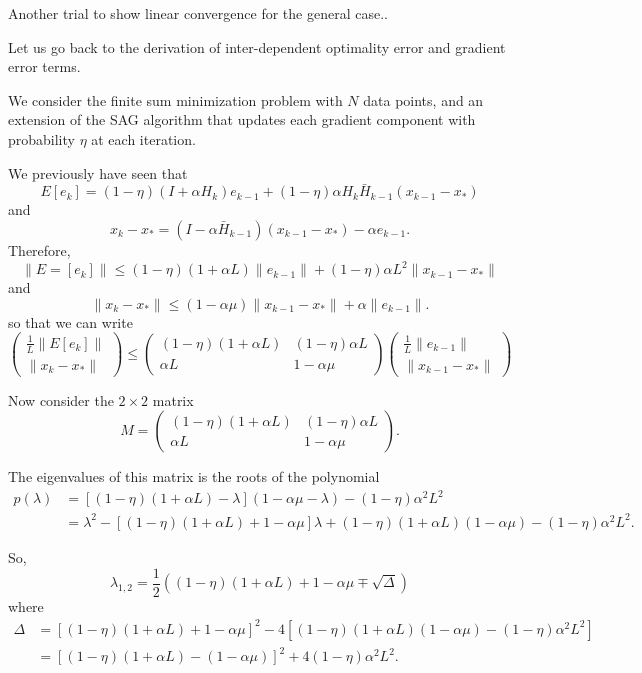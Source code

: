 \documentclass{article}
\begin{document}
 
\noindent

Another trial to show linear convergence for the general case..

\bigskip

Let us go back to the derivation of inter-dependent optimality error and gradient error terms.

We consider the finite sum minimization problem with $N$ data points, and an extension of the SAG algorithm that updates each gradient component with probability $\eta$ at each iteration.

We previously have seen that
\[
  E[e_k]=(1-\eta)(I+\alpha H_k)e_{k-1} + (1-\eta)\alpha H_k\bar H_{k-1}(x_{k-1}-x_\ast)
\]
and
\[
x_k-x_\ast=(I-\alpha\bar H_{k-1})(x_{k-1}-x_\ast) -\alpha e_{k-1}.
\]
Therefore,
\[
  \|E=[e_k]\|\leq(1-\eta)(1+\alpha L)\|e_{k-1}\| + (1-\eta)\alpha L^2\|x_{k-1}-x_\ast\|
\]
and
\[
\|x_k-x_\ast\|\leq(1-\alpha\mu)\|x_{k-1}-x_\ast\| +\alpha \|e_{k-1}\|.
\]
so that we can write
\[
 \begin{pmatrix} \displaystyle\frac{1}{L}\|E[e_k]\| \\
  \|x_k-x_\ast\|
 \end{pmatrix} \leq 
 \begin{pmatrix} (1-\eta)(1+\alpha L) & (1-\eta)\alpha L\\  
                   \alpha L  & 1-\alpha\mu \end{pmatrix}                  
 \begin{pmatrix} \displaystyle\frac{1}{L}\|e_{k-1}\| \\
  \|x_{k-1}-x_\ast\|
 \end{pmatrix}                  
\]

\bigskip
Now consider the $2\times 2$ matrix
\[
M = \begin{pmatrix} (1-\eta)(1+\alpha L) & (1-\eta)\alpha L\\  
                   \alpha L  & 1-\alpha\mu \end{pmatrix}.    
\]

The eigenvalues of this matrix is the roots of the polynomial
\begin{align*}
p(\lambda) &= \left[(1-\eta)(1+\alpha L)-\lambda\right](1-\alpha\mu-\lambda)-(1-\eta)\alpha^2 L^2\\
& = \lambda^2 - \left[(1-\eta)(1+\alpha L)+1-\alpha\mu\right]\lambda + (1-\eta)(1+\alpha L)(1-\alpha\mu)-(1-\eta)\alpha^2 L^2.
\end{align*}

So, 
\[
 \lambda_{1,2}=\frac{1}{2}\left((1-\eta)(1+\alpha L)+1-\alpha\mu\mp\sqrt{\Delta}\right)
\]
where
\begin{align*}
 \Delta &=\left[(1-\eta)(1+\alpha L)+1-\alpha\mu\right]^2-4\left[(1-\eta)(1+\alpha L)(1-\alpha\mu)-(1-\eta)\alpha^2 L^2\right]\\
 &= \left[(1-\eta)(1+\alpha L)-(1-\alpha\mu)\right]^2+4(1-\eta)\alpha^2 L^2.
\end{align*}
\end{document}
